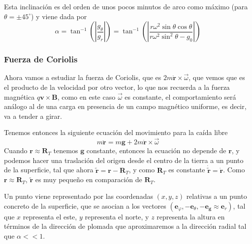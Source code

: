 Esta inclinación es del orden de unos pocos minutos de arco como máximo (para $\theta=\pm 45^\circ$) y viene dada por
\begin{equation} \label{6.1.1}
    \alpha = \tan^{-1}\left(\left|\frac{g_\theta}{g_r}\right|\right) = \tan^{-1}\left(\left|\frac{r\omega^2 \sin \theta \cos \theta}{r\omega^2\sin^2\theta-g_0}\right|\right)
\end{equation} 
\vspace{-20pt}
\subsubsection{Fuerza de Coriolis}
Ahora vamos a estudiar la fuerza de Coriolis, que es $2 m \dot{\mathbf{r}} \times  \vec{\omega}$, que vemos que es el producto de la velocidad por otro vector, lo que nos recuerda a la fuerza magnética $q \mathbf{v} \times \mathbf{B}$, como en este caso $\vec\omega$ es constante, el comportamiento será análogo al de una carga en presencia de un campo magnético uniforme, es decir, va a tender a girar.

Tenemos entonces la siguiente ecuación del movimiento para la caída libre
\begin{equation} \label{6.1.1}
    m\ddot{\mathbf{r}}=  m\mathbf{g} + 2 m \dot{\mathbf{r}} \times  \vec{\omega}
\end{equation} 
Cuando $\mathbf{r} \approx \mathbf{R}_T$ tenemos $\mathbf{g}$ constante, entonces la ecuación no depende de $\mathbf{r}$, y podemos hacer una traslación del origen desde el centro de la tierra a un punto de la superficie, tal que ahora $\tilde{\mathbf{r}} = \mathbf{r} - \mathbf{R}_T$, y como $\mathbf{R}_T$ es constante $\dot{\tilde{\mathbf{r}}} = \dot{\mathbf{r}}$. Como $\mathbf{r} \approx \mathbf{R}_T$, $\tilde{\mathbf{r}}$ es muy pequeño en comparación de $\mathbf{R}_T$.

Un punto viene representado por las coordenadas $(x,y,z)$ relativas a un punto concreto de la superficie, que se asocian a los vectores $(\mathbf{e}_\varphi,-\mathbf{e}_\theta,-\mathbf{e}_\mathbf{g} \approx \mathbf{e}_r)$, tal que $x$ representa el este, $y$ representa el norte, y $z$ representa la altura en términos de la dirección de plomada que aproximaremos a la dirección radial tal que $\alpha << 1$.

